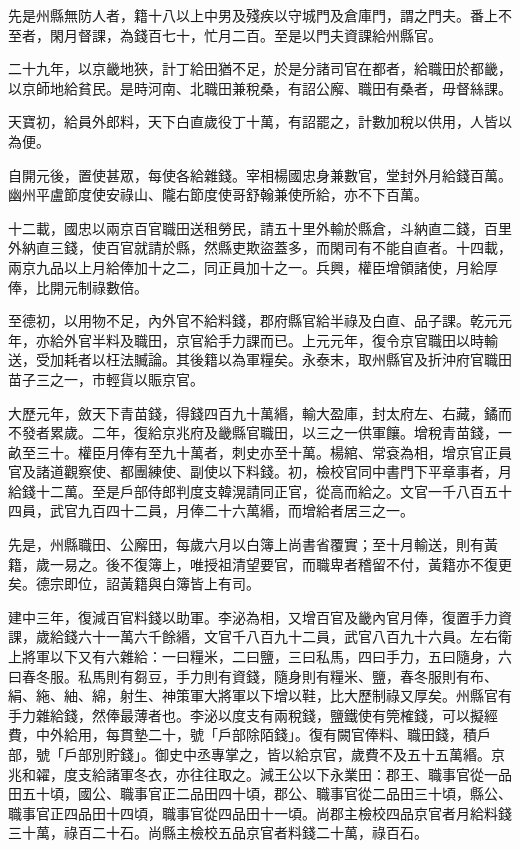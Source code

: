 \begin{pinyinscope}
 先是州縣無防人者，籍十八以上中男及殘疾以守城門及倉庫門，謂之門夫。番上不至者，閑月督課，為錢百七十，忙月二百。至是以門夫資課給州縣官。



 二十九年，以京畿地狹，計丁給田猶不足，於是分諸司官在都者，給職田於都畿，以京師地給貧民。是時河南、北職田兼稅桑，有詔公廨、職田有桑者，毋督絲課。



 天寶初，給員外郎料，天下白直歲役丁十萬，有詔罷之，計數加稅以供用，人皆以為便。



 自開元後，置使甚眾，每使各給雜錢。宰相楊國忠身兼數官，堂封外月給錢百萬。幽州平盧節度使安祿山、隴右節度使哥舒翰兼使所給，亦不下百萬。



 十二載，國忠以兩京百官職田送租勞民，請五十里外輸於縣倉，斗納直二錢，百里外納直三錢，使百官就請於縣，然縣吏欺盜蓋多，而閑司有不能自直者。十四載，兩京九品以上月給俸加十之二，同正員加十之一。兵興，權臣增領諸使，月給厚俸，比開元制祿數倍。



 至德初，以用物不足，內外官不給料錢，郡府縣官給半祿及白直、品子課。乾元元年，亦給外官半料及職田，京官給手力課而已。上元元年，復令京官職田以時輸送，受加耗者以枉法贓論。其後籍以為軍糧矣。永泰末，取州縣官及折沖府官職田苗子三之一，市輕貨以賑京官。



 大歷元年，斂天下青苗錢，得錢四百九十萬緡，輸大盈庫，封太府左、右藏，鐍而不發者累歲。二年，復給京兆府及畿縣官職田，以三之一供軍饟。增稅青苗錢，一畝至三十。權臣月俸有至九十萬者，刺史亦至十萬。楊綰、常袞為相，增京官正員官及諸道觀察使、都團練使、副使以下料錢。初，檢校官同中書門下平章事者，月給錢十二萬。至是戶部侍郎判度支韓滉請同正官，從高而給之。文官一千八百五十四員，武官九百四十二員，月俸二十六萬緡，而增給者居三之一。



 先是，州縣職田、公廨田，每歲六月以白簿上尚書省覆實；至十月輸送，則有黃籍，歲一易之。後不復簿上，唯授祖清望要官，而職卑者稽留不付，黃籍亦不復更矣。德宗即位，詔黃籍與白簿皆上有司。



 建中三年，復減百官料錢以助軍。李泌為相，又增百官及畿內官月俸，復置手力資課，歲給錢六十一萬六千餘緡，文官千八百九十二員，武官八百九十六員。左右衛上將軍以下又有六雜給：一曰糧米，二曰鹽，三曰私馬，四曰手力，五曰隨身，六曰春冬服。私馬則有芻豆，手力則有資錢，隨身則有糧米、鹽，春冬服則有布、絹、絁、紬、綿，射生、神策軍大將軍以下增以鞋，比大歷制祿又厚矣。州縣官有手力雜給錢，然俸最薄者也。李泌以度支有兩稅錢，鹽鐵使有筦榷錢，可以擬經費，中外給用，每貫墊二十，號「戶部除陌錢」。復有闕官俸料、職田錢，積戶部，號「戶部別貯錢」。御史中丞專掌之，皆以給京官，歲費不及五十五萬緡。京兆和糴，度支給諸軍冬衣，亦往往取之。減王公以下永業田：郡王、職事官從一品田五十頃，國公、職事官正二品田四十頃，郡公、職事官從二品田三十頃，縣公、職事官正四品田十四頃，職事官從四品田十一頃。尚郡主檢校四品京官者月給料錢三十萬，祿百二十石。尚縣主檢校五品京官者料錢二十萬，祿百石。




\end{pinyinscope}

